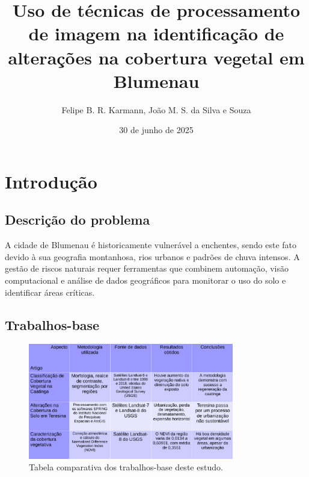 \documentclass{article}
\author{Felipe B. R. Karmann, João M. S. da Silva e Souza}
\date{30 de junho de 2025}
\title{Uso de técnicas de processamento de imagem na identificação de alterações na cobertura vegetal em Blumenau}
\begin{document}
\maketitle

\section{Introdução}
\subsection{Descrição do problema}

A cidade de Blumenau é historicamente vulnerável a enchentes, sendo este fato devido à sua geografia montanhosa, rios urbanos e padrões de chuva intensos. A gestão de riscos naturais requer ferramentas que combinem automação, visão computacional e análise de dados geográficos para monitorar o uso do solo e identificar áreas críticas.

\subsection{Trabalhos-base}

\begin{figure}[H]
  \centering
  \includegraphics[width=0.8\textwidth]{../tabela.png}
  \caption{Tabela comparativa dos trabalhos-base deste estudo.}
  \label{Tabela comparativa}
\end{figure}
\end{document}
